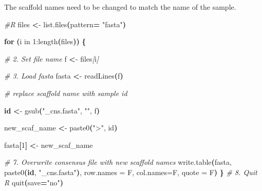 \documentclass[
  12pt,
]{article}
\newenvironment{Shaded}{\begin{snugshade}}{\end{snugshade}}
\newcommand{\AttributeTok}[1]{\textcolor[rgb]{0.13,0.29,0.53}{#1}}
\newcommand{\CommentTok}[1]{\textcolor[rgb]{0.56,0.35,0.01}{\textit{#1}}}
\newcommand{\ControlFlowTok}[1]{\textcolor[rgb]{0.13,0.29,0.53}{\textbf{#1}}}
\newcommand{\DecValTok}[1]{\textcolor[rgb]{0.00,0.00,0.81}{#1}}
\newcommand{\ErrorTok}[1]{\textcolor[rgb]{0.64,0.00,0.00}{\textbf{#1}}}
\newcommand{\ExtensionTok}[1]{#1}
\newcommand{\FunctionTok}[1]{\textcolor[rgb]{0.13,0.29,0.53}{\textbf{#1}}}
\newcommand{\KeywordTok}[1]{\textcolor[rgb]{0.13,0.29,0.53}{\textbf{#1}}}
\newcommand{\NormalTok}[1]{#1}
\newcommand{\OperatorTok}[1]{\textcolor[rgb]{0.81,0.36,0.00}{\textbf{#1}}}
\newcommand{\PreprocessorTok}[1]{\textcolor[rgb]{0.56,0.35,0.01}{\textit{#1}}}
\newcommand{\SpecialStringTok}[1]{\textcolor[rgb]{0.31,0.60,0.02}{#1}}
\newcommand{\StringTok}[1]{\textcolor[rgb]{0.31,0.60,0.02}{#1}}
\newcommand{\VariableTok}[1]{\textcolor[rgb]{0.00,0.00,0.00}{#1}}
\begin{document}
\begin{Shaded}
\end{Shaded}

The scaffold names need to be changed to match the name of the sample.

\begin{Shaded}
\begin{Highlighting}[]
\CommentTok{\#R}
\ExtensionTok{files} \OperatorTok{\textless{}}\NormalTok{{-} list.files}\ErrorTok{(}\VariableTok{pattern}\OperatorTok{=} \StringTok{"fasta"}\KeywordTok{)}

\ControlFlowTok{for} \KeywordTok{(}\ExtensionTok{i}\NormalTok{ in 1:length}\ErrorTok{(}\ExtensionTok{files}\KeywordTok{))} \KeywordTok{\{}
  
  \CommentTok{\# 2. Set file name}
  \ExtensionTok{f} \OperatorTok{\textless{}}\NormalTok{{-} files}\PreprocessorTok{[}\SpecialStringTok{i}\PreprocessorTok{]}
  
  \CommentTok{\# 3. Load fasta }
  \ExtensionTok{fasta} \OperatorTok{\textless{}}\NormalTok{{-} readLines}\ErrorTok{(}\ExtensionTok{f}\KeywordTok{)} 
  
  \CommentTok{\# replace scaffold name with sample id}
  
  \FunctionTok{id} \OperatorTok{\textless{}}\NormalTok{{-} gsub}\ErrorTok{(}\StringTok{"\_cns.fasta"}\ExtensionTok{,} \StringTok{""}\NormalTok{, f}\KeywordTok{)}
  
  \ExtensionTok{new\_scaf\_name} \OperatorTok{\textless{}}\NormalTok{{-} paste0}\ErrorTok{(}\StringTok{"\textgreater{}"}\ExtensionTok{,}\NormalTok{ id}\KeywordTok{)}
  
  \VariableTok{fasta}\OperatorTok{[}\DecValTok{1}\OperatorTok{]} \OperatorTok{\textless{}}\NormalTok{{-} }\ExtensionTok{new\_scaf\_name}
  
  \CommentTok{\# 7. Overwrite consensus file with new scaffold names}
  \ExtensionTok{write.table}\ErrorTok{(}\ExtensionTok{fasta,}\NormalTok{ paste0}\ErrorTok{(}\FunctionTok{id}\NormalTok{, }\StringTok{"\_cns.fasta"}\KeywordTok{)}\ExtensionTok{,}\NormalTok{ row.names = F, col.names=F, quote = F}\KeywordTok{)}
\KeywordTok{\}}  
  \CommentTok{\# 8. Quit R}
  \ExtensionTok{quit}\ErrorTok{(}\VariableTok{save}\OperatorTok{=}\StringTok{"no"}\KeywordTok{)}
\end{Highlighting}
\end{Shaded}
\end{document}
